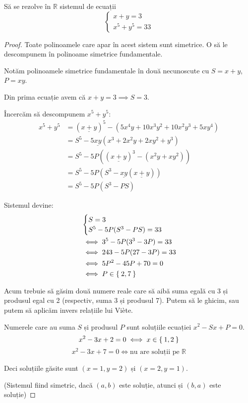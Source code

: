 \begin{exercise}[4.25]
Să se rezolve în \(\mathbb{R}\) sistemul de ecuații
\[
\begin{cases}
    x + y = 3 \\
    x^5 + y^5 = 33
\end{cases}
\]
\end{exercise}
\begin{proof}
Toate polinoamele care apar în acest sistem sunt simetrice.
O să le descompunem în polinoame simetrice fundamentale.

Notăm polinoamele simetrice fundamentale în două necunoscute cu \(S = x + y\), \(P = x y\).

Din prima ecuație avem că \(x + y = 3 \implies S = 3\).

Încercăm să descompunem \(x^5 + y^5\):
\begin{align*}
    x^5 + y^5 &= (\underline{x + y})^5 - (5 x^4 y + 10 x^3 y^2 + 10 x^2 y^3 + 5 x y^4) \\
    &= S^5 - 5 \underline{x y} (x^3 + 2 x^2 y + 2 x y^2 + y^3) \\
    &= S^5 - 5P ((\underline{x + y})^3 - (x^2 y + x y^2)) \\
    &= S^5 - 5P (S^3 - \underline{x y} (\underline{x + y})) \\
    &= S^5 - 5P (S^3 - P S)
\end{align*}

Sistemul devine:
\begin{align*}
&\begin{cases}
S = 3 \\
S^5 -  5P (S^3 - P S) = 33
\end{cases} \\
&\iff 3^5 - 5P (3^3 - 3P) = 33 \\
&\iff 243 - 5P (27 - 3P) = 33 \\
&\iff 5P^2 - 45P + 70 = 0 \\
&\iff P \in \Set{ 2, 7 }
\end{align*}

Acum trebuie să găsim două numere reale care să aibă suma egală cu 3 și produsul egal cu 2 (respectiv, suma 3 și produsul 7). Putem să le ghicim, sau putem să aplicăm invers relațiile lui Viète.

Numerele care au suma \(S\) și produsul \(P\) sunt soluțiile ecuației \(x^2 - Sx + P = 0\).
\[
x^2 - 3x + 2 = 0 \iff x \in \Set{ 1, 2 }
\]
\[
x^2 - 3x + 7 = 0 \iff \text{nu are soluții pe \(\mathbb{R}\)}
\]

Deci soluțiile găsite sunt \((x = 1, y = 2)\) și \((x = 2, y = 1)\).

(Sistemul fiind simetric, dacă \((a, b)\) este soluție, atunci și \((b, a)\) este soluție)
\end{proof}

